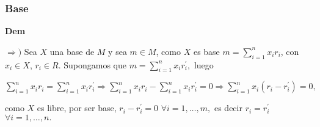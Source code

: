 \documentclass[notes=show]{beamer}%
\begin{document}
\begin{frame}%


\bigskip\qquad%
\frametitle{Base}%


\textbf{\bigskip Dem}

$\Rightarrow)$ Sea $X$ una base de $M$ y sea $m\in M$, como $X$ es base $m=%
{\displaystyle\sum\limits_{i=1}^{n}}
x_{i}r_{i}$, con $x_{i}\in X$, $r_{i}\in R.$ Supongamos que $m=%
{\displaystyle\sum\limits_{i=1}^{n}}
x_{i}r_{i}^{\prime},$ luego

\bigskip$%
{\displaystyle\sum\limits_{i=1}^{n}}
x_{i}r_{i}=%
{\displaystyle\sum\limits_{i=1}^{n}}
x_{i}r_{i}^{\prime}\Rightarrow%
{\displaystyle\sum\limits_{i=1}^{n}}
x_{i}r_{i}-%
{\displaystyle\sum\limits_{i=1}^{n}}
x_{i}r_{i}^{\prime}=0\Rightarrow%
{\displaystyle\sum\limits_{i=1}^{n}}
x_{i}(r_{i}-r_{i}^{\prime})=0,$

\bigskip

como $X$ es libre, por ser base, $r_{i}-r_{i}^{\prime}=0$ $\forall
i=1,\ldots,m,$ es decir $r_{i}=r_{i}^{\prime}$ $\forall i=1,\ldots,n.$%

\transboxout
\end{frame}%


\bigskip%
\end{document}
